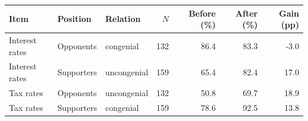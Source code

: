 \begin{tabular}{lllrrrr}
\toprule
Item & Position & Relation & $N$ & Before (\%) & After (\%) & Gain (pp) \\
\midrule
Interest rates & Opponents & congenial & 132 & 86.4 & 83.3 & -3.0 \\
Interest rates & Supporters & uncongenial & 159 & 65.4 & 82.4 & 17.0 \\
Tax rates & Opponents & uncongenial & 132 & 50.8 & 69.7 & 18.9 \\
Tax rates & Supporters & congenial & 159 & 78.6 & 92.5 & 13.8 \\
\bottomrule
\end{tabular}
